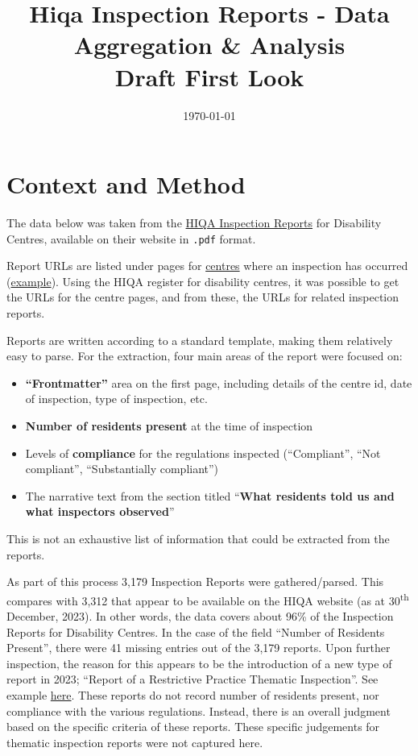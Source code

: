\documentclass[a4paper,11pt,twoside]{article}
\date{\today}
\title{Hiqa Inspection Reports - Data Aggregation \& Analysis\\\medskip
\large Draft First Look}
\begin{document}
\maketitle
\tableofcontents

\clearpage
\section{Context and Method}
\label{sec:org4230c98}
The data below was taken from the \href{https://www.hiqa.ie/reports-and-publications/inspection-reports}{HIQA Inspection Reports} for Disability Centres, available on their website in \texttt{.pdf} format.

Report URLs are listed under pages for \href{https://www.hiqa.ie/find-a-centre}{centres} where an inspection has occurred (\href{https://www.hiqa.ie/areas-we-work/find-a-centre/st-dominics-services}{example}). Using the HIQA register for disability centres, it was possible to get the URLs for the centre pages, and from these, the URLs for related inspection  reports.

Reports are written according to a standard template, making them relatively easy to parse. For the extraction, four main areas of the report were focused on:

\begin{itemize}
\item \textbf{``Frontmatter''} area on the first page, including details of the centre id, date of inspection, type of inspection, etc.
\item \textbf{Number of residents present} at the time of inspection
\item Levels of \textbf{compliance} for the regulations inspected (``Compliant'', ``Not compliant'', ``Substantially compliant'')
\item The narrative text from the section titled ``\textbf{What residents told us and what inspectors observed}''
\end{itemize}

This is not an exhaustive list of information that could be extracted from the reports.

As part of this process 3,179 Inspection Reports were gathered/parsed. This compares with 3,312 that appear to be available on the HIQA website (as at 30\textsuperscript{th} December, 2023). In other words, the data covers about 96\% of the Inspection Reports for Disability Centres. In the case of the field ``Number of Residents Present'', there were 41 missing entries out of the 3,179 reports. Upon further inspection, the reason for this appears to be the introduction of a new type of report in 2023; ``Report of a Restrictive Practice Thematic Inspection''. See example \href{https://www.hiqa.ie/system/files?file=inspectionreports/5654-an-diadan-26-september-2023.pdf}{here}. These reports do not record number of residents present, nor compliance with the various regulations. Instead, there is an overall judgment based on the specific criteria of these reports. These specific judgements for thematic inspection reports were not captured here.
\end{document}
